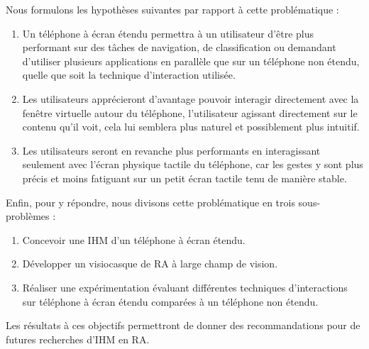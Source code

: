 Nous formulons les hypothèses suivantes par rapport à cette problématique :
\begin{enumerate}[label={(H\arabic*)}]
  \item Un téléphone à écran étendu permettra à un utilisateur d'être plus performant sur des tâches de navigation, de classification ou demandant d'utiliser plusieurs applications en parallèle que sur un téléphone non étendu, quelle que soit la technique d'interaction utilisée.
  \item Les utilisateurs apprécieront d'avantage pouvoir interagir directement avec la fenêtre virtuelle autour du téléphone, l'utilisateur agissant directement sur le contenu qu'il voit, cela lui semblera plus naturel et possiblement plus intuitif.
  \item Les utilisateurs seront en revanche plus performants en interagissant seulement avec l'écran physique tactile du téléphone, car les gestes y sont plus précis et moins fatiguant sur un petit écran tactile tenu de manière stable.
\end{enumerate}
\medskip
 
Enfin, pour y répondre, nous divisons cette problématique en trois sous-problèmes :
\begin{enumerate}
  \item Concevoir une IHM d'un téléphone à écran étendu.
  \item Développer un visiocasque de RA à large champ de vision.
  \item Réaliser une expérimentation évaluant différentes techniques d'interactions sur téléphone à écran étendu comparées à un téléphone non étendu.
\end{enumerate}
\medskip

Les résultats à ces objectifs permettront de donner des recommandations pour de futures recherches d'IHM en RA.